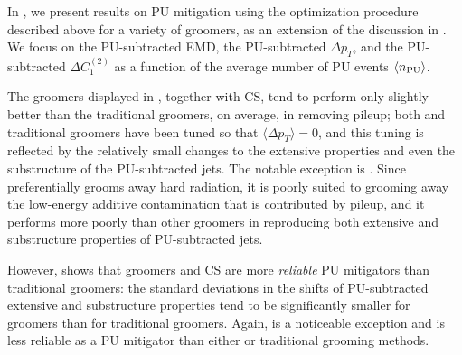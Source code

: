 In , we present results on PU mitigation using the optimization procedure described above for a variety of groomers, as an extension of the discussion in .
%
We focus on the PU-subtracted EMD, the PU-subtracted \(\Delta p_T\), and the PU-subtracted \(\Delta C_1^{(2)}\) as a function of the average number of PU events \(\langle n_{\rm PU} \rangle\).

The \PIRANHA{} groomers displayed in , together with CS, tend to perform only slightly better than the traditional groomers, on average, in removing pileup;
%
both \PIRANHA{} and traditional groomers have been tuned so that \(\langle \Delta p_T\rangle=0\), and this tuning is reflected by the relatively small changes to the extensive properties and even the substructure of the PU-subtracted jets.
%
The notable exception is .
%
Since  preferentially grooms away hard radiation, it is poorly suited to grooming away the low-energy additive contamination that is contributed by pileup, and it performs more poorly than other \PIRANHA{} groomers in reproducing both extensive and substructure properties of PU-subtracted jets.

However,  shows that \PIRANHA{} groomers and CS are more \textit{reliable} PU mitigators than traditional groomers:
%
the standard deviations in the shifts of PU-subtracted extensive and substructure properties tend to be significantly smaller for \PIRANHA{} groomers than for traditional groomers.
%
Again,  is a noticeable exception and is less reliable as a PU mitigator than either \PIRANHA{} or traditional grooming methods.


